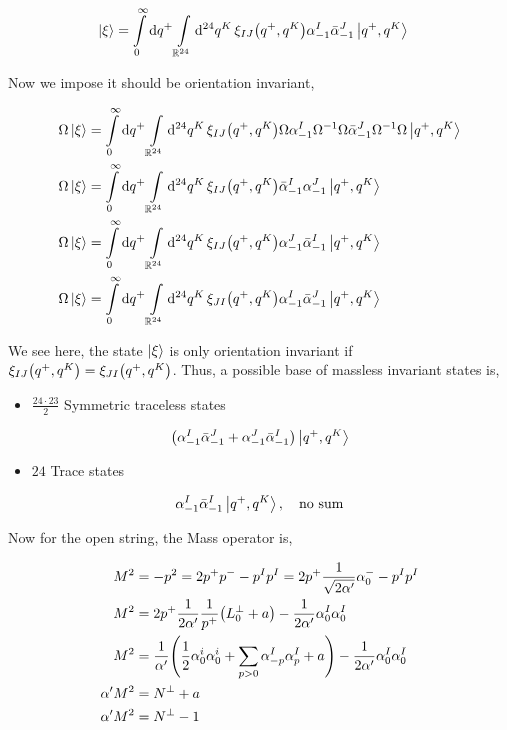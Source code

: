 \begin{align*}
    \ket{\xi}&=\int\limits_0^\infty\dd{q^+}\int\limits_{\mathbb R^{24}}\dd[24]{q^K}\xi_{IJ}\qty(q^+,q^K)\alpha^I_{-1}{\bar\alpha}^J_{-1}\ket{q^+,q^K}
\end{align*}

Now we impose it should be orientation invariant,

\begin{align*}
    \Omega\ket{\xi}&=\int\limits_0^\infty\dd{q^+}\int\limits_{\mathbb R^{24}}\dd[24]{q^K}\xi_{IJ}\qty(q^+,q^K)\Omega\alpha^I_{-1}\Omega^{-1}\Omega{\bar\alpha}^J_{-1}\Omega^{-1}\Omega\ket{q^+,q^K}\\
    \Omega\ket{\xi}&=\int\limits_0^\infty\dd{q^+}\int\limits_{\mathbb R^{24}}\dd[24]{q^K}\xi_{IJ}\qty(q^+,q^K){\bar\alpha}^I_{-1}{\alpha}^J_{-1}\ket{q^+,q^K}\\
    \Omega\ket{\xi}&=\int\limits_0^\infty\dd{q^+}\int\limits_{\mathbb R^{24}}\dd[24]{q^K}\xi_{IJ}\qty(q^+,q^K){\alpha}^J_{-1}{\bar\alpha}^I_{-1}\ket{q^+,q^K}\\
    \Omega\ket{\xi}&=\int\limits_0^\infty\dd{q^+}\int\limits_{\mathbb R^{24}}\dd[24]{q^K}\xi_{JI}\qty(q^+,q^K){\alpha}^I_{-1}{\bar\alpha}^J_{-1}\ket{q^+,q^K}
\end{align*}

We see here, the state $\ket\xi$ is only orientation invariant if $\xi_{IJ}\qty(q^+,q^K)=\xi_{JI}\qty(q^+,q^K)$. Thus, a possible base of massless invariant states is,

\begin{itemize}
    \item $\frac{24\cdot 23}{2}$ Symmetric traceless states
\end{itemize}
\begin{align*}
    \qty(\alpha^I_{-1}{\bar\alpha}^J_{-1}+\alpha^J_{-1}{\bar\alpha}^I_{-1})\ket{q^+,q^K}
\end{align*}

\begin{itemize}
    \item $24$ Trace states
\end{itemize}
\begin{align*}
    \alpha^I_{-1}{\bar\alpha}^I_{-1}\ket{q^+,q^K},\ \ \ \textnormal{no sum}
\end{align*}

\probitem{}

Now for the open string, the Mass operator is,

\begin{align*}
    M^2&=-p^2=2p^+p^--p^Ip^I=2p^+\frac{1}{\sqrt{2\alpha'}}\alpha_0^--p^Ip^I\\
    M^2&=2p^+\frac{1}{2\alpha'}\frac{1}{p^+}\qty(L^\perp_0+a)-\frac{1}{2\alpha'}\alpha_0^I\alpha_0^I\\
    M^2&=\frac{1}{\alpha'}\qty(\frac12\alpha_0^i\alpha_0^i+\sum\limits_{p> 0}\alpha^I_{-p}\alpha^I_{p}+a)-\frac{1}{2\alpha'}\alpha_0^I\alpha_0^I\\
    \alpha'M^2&=N^\perp+a\\
    \alpha'M^2&=N^\perp-1
\end{align*}


